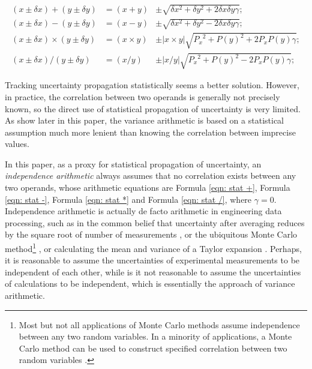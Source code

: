 \documentclass[twoside]{article}
\numberwithin{equation}{section}
\begin{document}
\begin{align}
\label{eqn: stat +} 
(x \pm \delta x) + (y \pm \delta y) & = (x + y) & \pm \sqrt{\delta x^{2} + \delta y^{2} + 2 \delta x \delta y \gamma}; \\
\label{eqn: stat -} 
(x \pm \delta x) - (y \pm \delta y) & = (x - y) & \pm \sqrt{\delta x^{2} + \delta y^{2} - 2 \delta x \delta y \gamma}; \\
\label{eqn: stat *} 
(x \pm \delta x) \times (y \pm \delta y) & = (x \times y) & \pm |x \times y| \sqrt{{P_x}^2 + {P(y)}^2 + 2 P_x P(y) \gamma}; \\
\label{eqn: stat /} 
(x \pm \delta x) / (y \pm \delta y) & = (x/y) & \pm |x / y| \sqrt{{P_x}^2 + {P(y)}^2 - 2 P_x P(y) \gamma};
\end{align}

Tracking uncertainty propagation statistically seems a better solution.  
However, in practice, the correlation between two operands is generally not precisely known, so the direct use of statistical propagation of uncertainty is very limited.  
As show later in this paper, the variance arithmetic is based on a statistical assumption much more lenient than knowing the correlation between imprecise values.

In this paper, as a proxy for statistical propagation of uncertainty, an \emph{independence arithmetic} always assumes that no correlation exists between any two operands, whose arithmetic equations are Formula \eqref{eqn: stat +}, Formula \eqref{eqn: stat -}, Formula \eqref{eqn: stat *} and Formula \eqref{eqn: stat /}, where $\gamma=0$.  
Independence arithmetic is actually de facto arithmetic in engineering data processing, such as in the common belief that uncertainty after averaging reduces by the square root of number of measurements \cite{Statistical_Methods}\cite{Precisions_Physical_Measurements}, or the ubiquitous Monte Carlo method\footnote{Most but not all applications of Monte Carlo methods assume independence between any two random variables.  
In a minority of applications, a Monte Carlo method can be used to construct specified correlation between two random variables \cite{Monte_Carlo_Statistics}.} \cite{Monte_Carlo_Method}\cite{Monte_Carlo_Statistics}, or calculating the mean and variance of a Taylor expansion \cite{Taylor_Expansion_Uncertainty}.  
Perhaps, it is reasonable to assume the uncertainties of experimental measurements to be independent of each other, while is it not reasonable to assume the uncertainties of calculations to be independent, which is essentially the approach of variance arithmetic.
\end{document}
